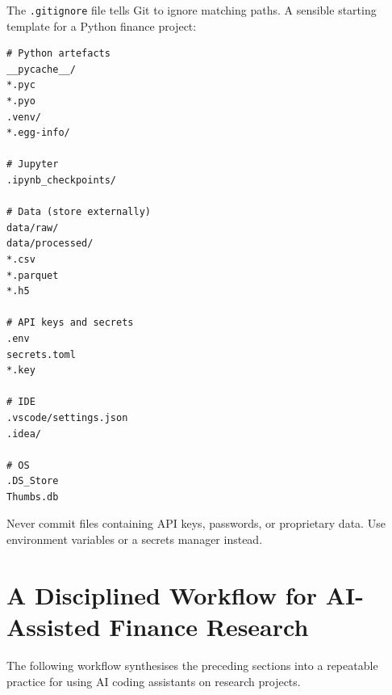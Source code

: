 The \texttt{.gitignore} file tells Git to ignore matching paths.  A sensible
starting template for a Python finance project:

\begin{verbatim}
# Python artefacts
__pycache__/
*.pyc
*.pyo
.venv/
*.egg-info/

# Jupyter
.ipynb_checkpoints/

# Data (store externally)
data/raw/
data/processed/
*.csv
*.parquet
*.h5

# API keys and secrets
.env
secrets.toml
*.key

# IDE
.vscode/settings.json
.idea/

# OS
.DS_Store
Thumbs.db
\end{verbatim}

Never commit files containing API keys, passwords, or proprietary data.
Use environment variables or a secrets manager instead.

\section{A Disciplined Workflow for AI-Assisted Finance Research}
\label{app:git:discipline}

\begin{context}
The following workflow synthesises the preceding sections into a repeatable
practice for using AI coding assistants on research projects.
\end{context}

